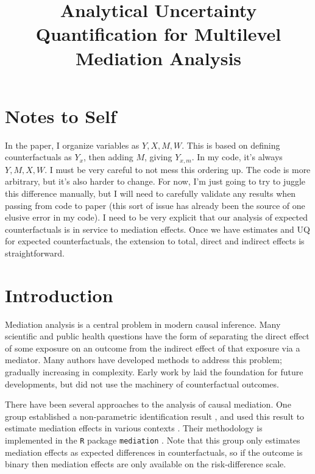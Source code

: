 \documentclass{article}
\title{Analytical Uncertainty Quantification for Multilevel Mediation Analysis}
\begin{document}
\maketitle
\section{Notes to Self}
\begin{outline}
    \1 In the paper, I organize variables as $Y, X, M, W$. This is based on defining counterfactuals as $Y_x$, then adding $M$, giving $Y_{x, m}$. In my code, it's always $Y, M, X, W$. I must be very careful to not mess this ordering up. The code is more arbitrary, but it's also harder to change. For now, I'm just going to try to juggle this difference manually, but I will need to carefully validate any results when passing from code to paper (this sort of issue has already been the source of one elusive error in my code).
    \1 I need to be very explicit that our analysis of expected counterfactuals is in service to mediation effects. Once we have estimates and UQ for expected counterfactuals, the extension to total, direct and indirect effects is straightforward.
\end{outline}



\section{Introduction}

Mediation analysis is a central problem in modern causal inference. Many scientific and public health questions have the form of separating the direct effect of some exposure on an outcome from the indirect effect of that exposure via a mediator. Many authors have developed methods to address this problem; gradually increasing in complexity. Early work by \citet{Bar86} laid the foundation for future developments, but did not use the machinery of counterfactual outcomes. 

There have been several approaches to the analysis of causal mediation. One group established a non-parametric identification result \citep{Ima10II}, and used this result to estimate mediation effects in various contexts \citep{Ima10I, Ima11}. Their methodology is implemented in the \texttt{R} package \texttt{mediation} \citep{Tin14}. Note that this group only estimates mediation effects as expected differences in counterfactuals, so if the outcome is binary then mediation effects are only available on the risk-difference scale.
\end{document}
